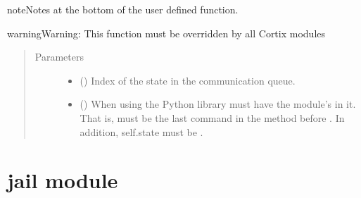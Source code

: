 \documentclass[letterpaper,10pt,openany,oneside,english]{sphinxmanual}
\begin{document}
\begin{fulllineitems}
\begin{fulllineitems}
\begin{sphinxadmonition}{note}{Notes}
at the bottom of the user defined  function.
\end{sphinxadmonition}

\begin{sphinxadmonition}{warning}{Warning:}
This function must be overridden by all Cortix modules
\end{sphinxadmonition}
\begin{quote}\begin{description}
\item[{Parameters}] \leavevmode\begin{itemize}
\item {} 
\sphinxstyleliteralstrong{\sphinxupquote{{[}}}\sphinxstyleliteralstrong{\sphinxupquote{{]}}} () \textendash{} Index of the state in the communication queue.

\item {} 
\sphinxstyleliteralstrong{\sphinxupquote{{[}}}\sphinxstyleliteralstrong{\sphinxupquote{{]}}} () \textendash{} When using the Python  library  must have
the module’s  in it. That is,
 must be the last command in the
method before . In addition, self.state must be .

\end{itemize}

\end{description}\end{quote}

\end{fulllineitems}


\end{fulllineitems}



\section{jail module}
\label{\detokenize{examples_rst/jail:module-jail}}\label{\detokenize{examples_rst/jail:jail-module}}\label{\detokenize{examples_rst/jail::doc}}
\end{document}
